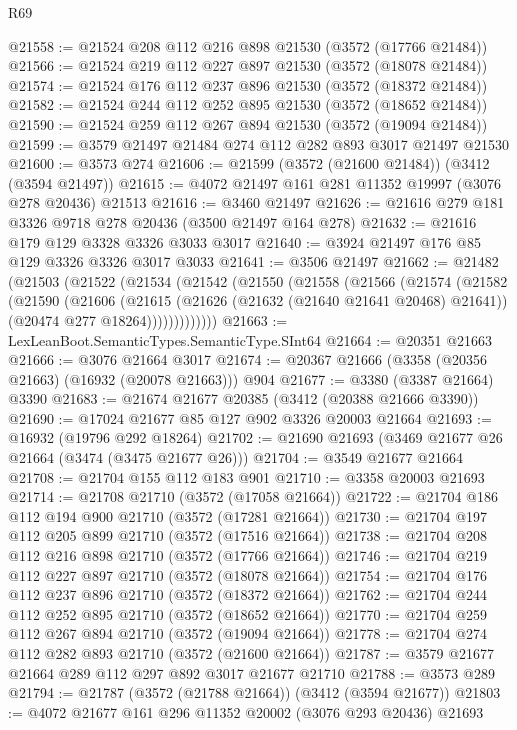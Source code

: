 \begin{lexlean}{R69}
\begin{coremodule}
@21558 := @21524 @208 @112 @216 @898 @21530 (@3572 (@17766 @21484))
@21566 := @21524 @219 @112 @227 @897 @21530 (@3572 (@18078 @21484))
@21574 := @21524 @176 @112 @237 @896 @21530 (@3572 (@18372 @21484))
@21582 := @21524 @244 @112 @252 @895 @21530 (@3572 (@18652 @21484))
@21590 := @21524 @259 @112 @267 @894 @21530 (@3572 (@19094 @21484))
@21599 := @3579 @21497 @21484 @274 @112 @282 @893 @3017 @21497 @21530
@21600 := @3573 @274
@21606 := @21599 (@3572 (@21600 @21484)) (@3412 (@3594 @21497))
@21615 := @4072 @21497 @161 @281 @11352 @19997 (@3076 @278 @20436) @21513
@21616 := @3460 @21497
@21626 := @21616 @279 @181 @3326 @9718 @278 @20436 (@3500 @21497 @164 @278)
@21632 := @21616 @179 @129 @3328 @3326 @3033 @3017
@21640 := @3924 @21497 @176 @85 @129 @3326 @3326 @3017 @3033
@21641 := @3506 @21497
@21662 := @21482
    (@21503
      (@21522
        (@21534
          (@21542
            (@21550
              (@21558
                (@21566
                  (@21574
                    (@21582
                      (@21590
                        (@21606
                          (@21615
                            (@21626 (@21632 (@21640 @21641 @20468) @21641))
                            (@20474 @277 @18264)))))))))))))
@21663 := LexLeanBoot.SemanticTypes.SemanticType.SInt64
@21664 := @20351 @21663
@21666 := @3076 @21664 @3017
@21674 := @20367 @21666 (@3358 (@20356 @21663) (@16932 (@20078 @21663))) @904
@21677 := @3380 (@3387 @21664) @3390
@21683 := @21674 @21677 @20385 (@3412 (@20388 @21666 @3390))
@21690 := @17024 @21677 @85 @127 @902 @3326 @20003 @21664
@21693 := @16932 (@19796 @292 @18264)
@21702 := @21690 @21693 (@3469 @21677 @26 @21664 (@3474 (@3475 @21677 @26)))
@21704 := @3549 @21677 @21664
@21708 := @21704 @155 @112 @183 @901
@21710 := @3358 @20003 @21693
@21714 := @21708 @21710 (@3572 (@17058 @21664))
@21722 := @21704 @186 @112 @194 @900 @21710 (@3572 (@17281 @21664))
@21730 := @21704 @197 @112 @205 @899 @21710 (@3572 (@17516 @21664))
@21738 := @21704 @208 @112 @216 @898 @21710 (@3572 (@17766 @21664))
@21746 := @21704 @219 @112 @227 @897 @21710 (@3572 (@18078 @21664))
@21754 := @21704 @176 @112 @237 @896 @21710 (@3572 (@18372 @21664))
@21762 := @21704 @244 @112 @252 @895 @21710 (@3572 (@18652 @21664))
@21770 := @21704 @259 @112 @267 @894 @21710 (@3572 (@19094 @21664))
@21778 := @21704 @274 @112 @282 @893 @21710 (@3572 (@21600 @21664))
@21787 := @3579 @21677 @21664 @289 @112 @297 @892 @3017 @21677 @21710
@21788 := @3573 @289
@21794 := @21787 (@3572 (@21788 @21664)) (@3412 (@3594 @21677))
@21803 := @4072 @21677 @161 @296 @11352 @20002 (@3076 @293 @20436) @21693

\end{coremodule}
\end{lexlean}
